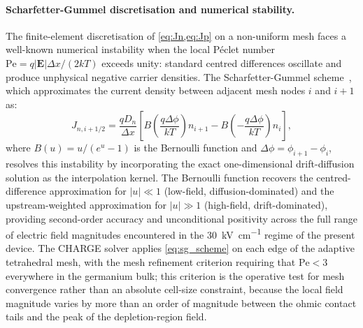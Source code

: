 \paragraph{Scharfetter-Gummel discretisation and numerical stability.}
The finite-element discretisation of \cref{eq:Jn,eq:Jp} on a non-uniform mesh
faces a well-known numerical instability when the local Péclet number
$\mathrm{Pe} = q|\mathbf{E}|\Delta x/(2kT)$ exceeds unity: standard centred
differences oscillate and produce unphysical negative carrier densities. The
Scharfetter-Gummel scheme~\cite{Alasio2024}, which approximates the current
density between adjacent mesh nodes $i$ and $i+1$ as:
\begin{equation}
    J_{n,i+1/2}
    = \frac{qD_n}{\Delta x}\!\left[
        B\!\left(\frac{q\Delta\phi}{kT}\right)n_{i+1}
      - B\!\left(-\frac{q\Delta\phi}{kT}\right)n_i
      \right],
    \label{eq:sg_scheme}
\end{equation}
where $B(u) = u/(e^u - 1)$ is the Bernoulli function and $\Delta\phi =
\phi_{i+1} - \phi_i$, resolves this instability by incorporating the exact
one-dimensional drift-diffusion solution as the interpolation kernel. The
Bernoulli function recovers the centred-difference approximation for
$|u| \ll 1$ (low-field, diffusion-dominated) and the upstream-weighted
approximation for $|u| \gg 1$ (high-field, drift-dominated), providing
second-order accuracy and unconditional positivity across the full range of
electric field magnitudes encountered in the \SI{30}{\kilo\volt\per\centi\metre}
regime of the present device. The CHARGE solver applies \cref{eq:sg_scheme}
on each edge of the adaptive tetrahedral mesh, with the mesh refinement
criterion requiring that $\mathrm{Pe} < 3$ everywhere in the germanium bulk;
this criterion is the operative test for mesh convergence rather than an
absolute cell-size constraint, because the local field magnitude varies by more
than an order of magnitude between the ohmic contact tails and the peak of the
depletion-region field.



